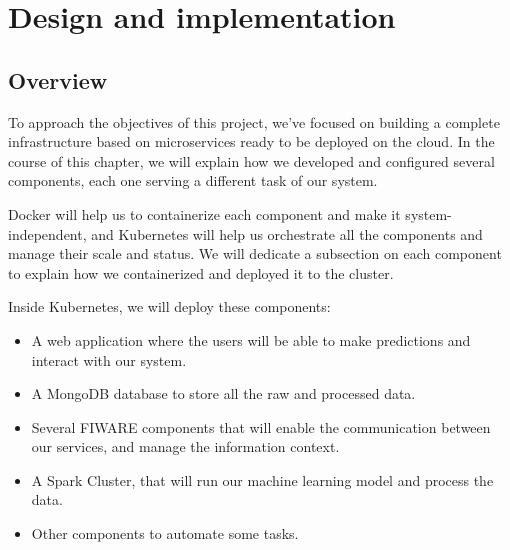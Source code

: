 \chapter{Design and implementation}
\label{chapter:DesignAndImplementation}
\section{Overview}
\label{section:Overview}

To approach the objectives of this project, we've focused on building a complete infrastructure based on microservices ready to be deployed on the cloud. In the course of this chapter, we will explain how we developed and configured several components, each one serving a  different task of our system.

Docker will help us to containerize each component and make it system-independent, and Kubernetes will help us orchestrate all the components and manage their scale and status. We will dedicate a subsection on each component to explain how we containerized and deployed it to the cluster. 

Inside Kubernetes, we will deploy these components:

\begin{itemize}
\item A web application where the users will be able to make predictions and interact with our system.
\item A MongoDB database to store all the raw and processed data.
\item Several FIWARE components that will enable the communication between our services, and manage the information context.
\item A Spark Cluster, that will run our machine learning model and process the data.
\item Other components to automate some tasks.
\end{itemize}

